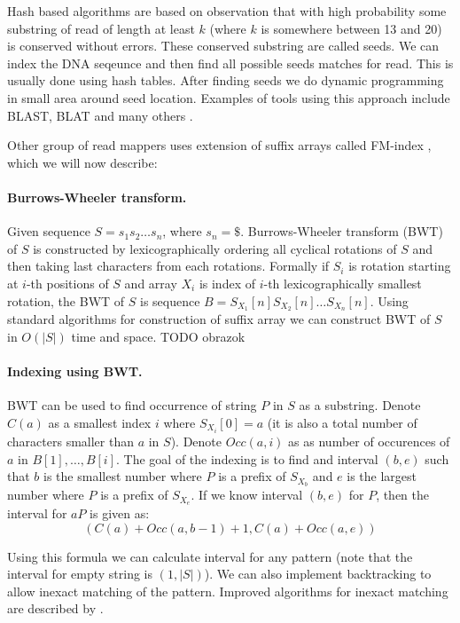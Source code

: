 Hash based algorithms are based on observation that with high
probability some substring of read of length at least $k$ (where $k$ is somewhere
between 13 and 20) is conserved without errors. These conserved substring
are called seeds. 
We can index the DNA seqeunce and then find all possible seeds matches for read.
This is usually done using hash tables. After finding seeds we do
dynamic programming in small area around seed location.
Examples of tools using this approach 
include BLAST, BLAT and many others \citep{blast,blat}.

Other group of read mappers uses extension of suffix arrays called FM-index
\citep{fmindex, fmindex2}, which we will now describe:

\paragraph{Burrows-Wheeler transform.} Given sequence $S = s_1 s_2 \dots s_n$, where
$s_n = \$$. Burrows-Wheeler transform (BWT) of $S$ is constructed
by lexicographically ordering all cyclical rotations of $S$ and then
taking last characters from each rotations.
Formally if $S_i$ is rotation starting at $i$-th positions of $S$ and array
$X_i$ is index of $i$-th lexicographically smallest rotation, the
BWT of $S$ is sequence $B = S_{X_1}[n] S_{X_2}[n] \dots S_{X_n}[n]$.
Using standard algorithms for construction of suffix array we
can construct BWT of $S$ in $O(|S|)$ time and space.
TODO obrazok

\paragraph{Indexing using BWT.}
BWT can be used to find occurrence of string $P$ in $S$ as a substring.
Denote $C(a)$ as a smallest index $i$ where $S_{X_i}[0] = a$ (it is also
a total number of characters smaller than $a$ in $S$).
Denote $Occ(a,i)$ as as number of occurences of $a$ in $B[1], \dots, B[i]$.
The goal of the indexing is to find and interval $(b, e)$ such that
$b$ is the smallest number where $P$ is a prefix of $S_{X_b}$
and $e$ is the largest number where $P$ is a prefix of $S_{X_e}$.
If we know interval $(b, e)$ for $P$, then the interval for
$aP$ is given as:
$$(C(a) + Occ(a, b - 1) + 1, C(a) + Occ(a, e))$$

Using this formula we can calculate interval for any pattern (note that
the interval for empty string is $(1, |S|)$). We can also implement
backtracking to allow inexact matching of the pattern. 
Improved algorithms for inexact matching are described by \citet{fmindex3}.

